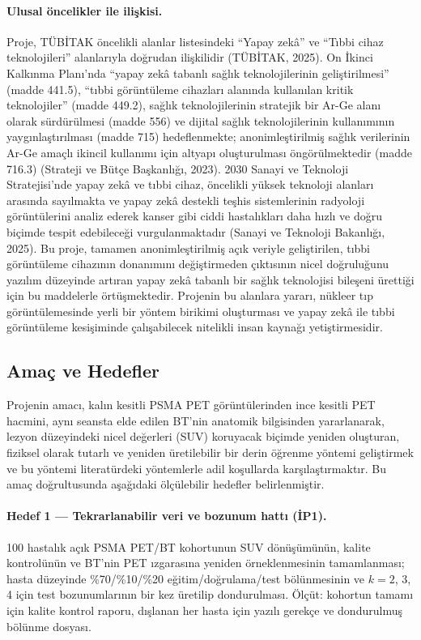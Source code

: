 \documentclass[11pt,a4paper]{article}
\begin{document}
\paragraph{Ulusal öncelikler ile ilişkisi.} Proje, TÜBİTAK öncelikli alanlar listesindeki
``Yapay zekâ'' ve ``Tıbbi cihaz teknolojileri'' alanlarıyla doğrudan ilişkilidir (TÜBİTAK, 2025).
On İkinci Kalkınma Planı'nda ``yapay zekâ tabanlı sağlık teknolojilerinin geliştirilmesi''
(madde 441.5), ``tıbbi görüntüleme cihazları alanında kullanılan kritik teknolojiler'' (madde
449.2), sağlık teknolojilerinin stratejik bir Ar-Ge alanı olarak sürdürülmesi (madde 556) ve
dijital sağlık teknolojilerinin kullanımının yaygınlaştırılması (madde 715) hedeflenmekte;
anonimleştirilmiş sağlık verilerinin Ar-Ge amaçlı ikincil kullanımı için altyapı oluşturulması
öngörülmektedir (madde 716.3) (Strateji ve Bütçe Başkanlığı, 2023). 2030 Sanayi ve Teknoloji
Stratejisi'nde yapay zekâ ve tıbbi cihaz, öncelikli yüksek teknoloji alanları arasında
sayılmakta ve yapay zekâ destekli teşhis sistemlerinin radyoloji görüntülerini analiz ederek
kanser gibi ciddi hastalıkları daha hızlı ve doğru biçimde tespit edebileceği vurgulanmaktadır
(Sanayi ve Teknoloji Bakanlığı, 2025). Bu proje, tamamen anonimleştirilmiş açık veriyle
geliştirilen, tıbbi görüntüleme cihazının donanımını değiştirmeden çıktısının nicel doğruluğunu
yazılım düzeyinde artıran yapay zekâ tabanlı bir sağlık teknolojisi bileşeni ürettiği için bu
maddelerle örtüşmektedir. Projenin bu alanlara yararı, nükleer tıp görüntülemesinde yerli bir
yöntem birikimi oluşturması ve yapay zekâ ile tıbbi görüntüleme kesişiminde çalışabilecek
nitelikli insan kaynağı yetiştirmesidir.

\subsection{Amaç ve Hedefler}

Projenin amacı, kalın kesitli PSMA PET görüntülerinden ince kesitli PET hacmini, aynı seansta elde
edilen BT'nin anatomik bilgisinden yararlanarak, lezyon düzeyindeki nicel değerleri (SUV)
koruyacak biçimde yeniden oluşturan, fiziksel olarak tutarlı ve yeniden üretilebilir bir derin
öğrenme yöntemi geliştirmek ve bu yöntemi literatürdeki yöntemlerle adil koşullarda
karşılaştırmaktır. Bu amaç doğrultusunda aşağıdaki ölçülebilir hedefler belirlenmiştir.

\paragraph{Hedef 1 --- Tekrarlanabilir veri ve bozunum hattı (İP1).} 100 hastalık açık PSMA
PET/BT kohortunun SUV dönüşümünün, kalite kontrolünün ve BT'nin PET ızgarasına yeniden
örneklenmesinin tamamlanması; hasta düzeyinde \%70/\%10/\%20 eğitim/doğrulama/test bölünmesinin
ve $k = 2$, 3, 4 için test bozunumlarının bir kez üretilip dondurulması. Ölçüt: kohortun tamamı
için kalite kontrol raporu, dışlanan her hasta için yazılı gerekçe ve dondurulmuş bölünme
dosyası.
\end{document}
